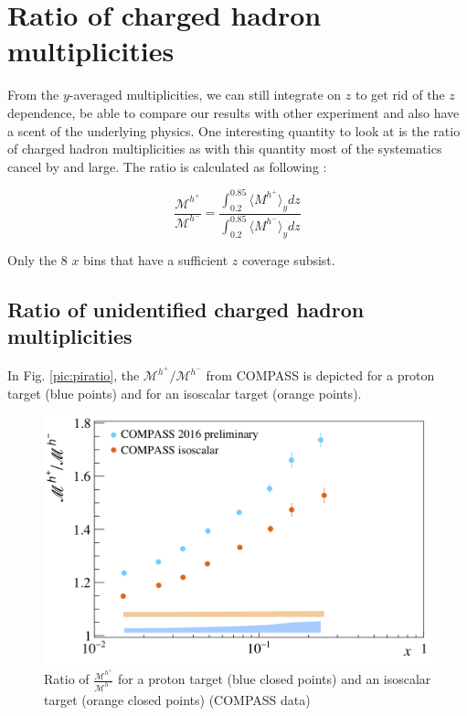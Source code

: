 \newpage

\section{Ratio of charged hadron multiplicities}

From the $y$-averaged multiplicities, we can still integrate on $z$ to get rid of the $z$ dependence, be able to compare our results with other experiment and also have a scent of the underlying physics. One interesting quantity to look at is the ratio of charged hadron multiplicities as with this quantity most of the systematics cancel by and large. The ratio is calculated as following :

\begin{equation}
  \frac{\mathscr{M}^{h^+}}{\mathscr{M}^{h^-}} = \frac{\int_{0.2}^{0.85} \langle M^{h^+} \rangle_y dz}{\int_{0.2}^{0.85} \langle M^{h^-} \rangle_y dz}
\end{equation}

Only the 8 $x$ bins that have a sufficient $z$ coverage subsist.

\subsection{Ratio of unidentified charged hadron multiplicities}

In Fig. \ref{pic:piratio}, the $\mathscr{M}^{h^+}/\mathscr{M}^{h^-}$ from COMPASS is depicted for a proton target (blue points) and for an isoscalar target (orange points).

\begin{figure}[!h]
  \centering
	\includegraphics[scale=0.5]{./gfx/hr.png}
	\caption{Ratio of $\frac{\mathscr{M}^{h^+}}{\mathscr{M}^{h^-}}$ for a proton target (blue closed points) and an isoscalar target (orange closed points) (COMPASS data)}
	\label{pic:hratio}
\end{figure}

